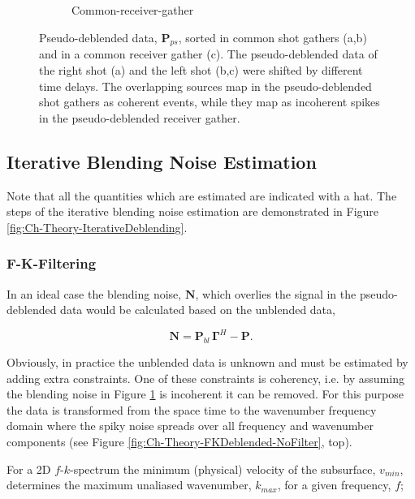 \begin{figure}
\begin{subfigure}[t]{0.25\textwidth}
		\caption{Common-receiver-gather}
		\label{fig:Ch-Theory-PseudoDeblendedCRG}
	\end{subfigure}
	\caption{Pseudo-deblended data, $\mathbf{P}_{ps}$, sorted in common shot gathers (a,b) and in a common receiver gather (c). The pseudo-deblended data of the right shot (a) and the left shot (b,c) were shifted by different time delays. The overlapping sources map in the pseudo-deblended shot gathers as coherent events, while they map as incoherent spikes in the pseudo-deblended receiver gather.}
	\label{fig:Ch-Theory-PseudoDeblended}

\end{figure}

\subsection{Iterative Blending Noise Estimation} \label{sec:IterBlenNoiseEst}

Note that all the quantities which are estimated are indicated with a hat. The steps of the iterative blending noise estimation are demonstrated in Figure \ref{fig:Ch-Theory-IterativeDeblending}.

\subsubsection*{F-K-Filtering}
In an ideal case the blending noise, $\mathbf{N}$, which overlies the signal in the pseudo-deblended data would be calculated based on the unblended data,

\begin{equation}
	\mathbf{N} = \mathbf{P}_{bl} \, \mathbf{\Gamma}^H - \mathbf{P}.
	\label{eq:Ch-Theory-Noise}
\end{equation}

Obviously, in practice the unblended data is unknown and must be estimated by adding extra constraints. One of these constraints is coherency, i.e. by assuming the blending noise in Figure \ref{fig:Ch-Theory-PseudoDeblendedCRG} is incoherent it can be removed. For this purpose the data is transformed from the space time to the wavenumber frequency domain where the spiky noise spreads over all frequency and wavenumber components (see Figure \ref{fig:Ch-Theory-FKDeblended-NoFilter}, top). 


For a 2D $f$-$k$-spectrum the minimum (physical) velocity of the subsurface, $v_{min}$, determines the maximum unaliased wavenumber, $k_{max}$,  for a given frequency, $f$;

